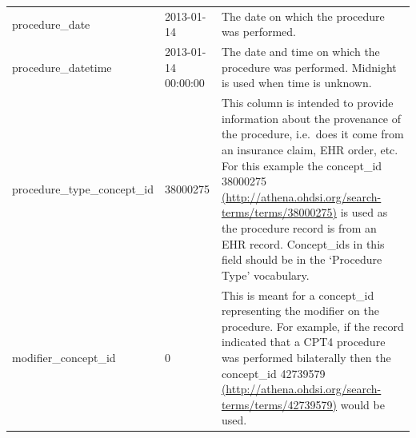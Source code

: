\documentclass[]{book}
\begin{document}
\begin{longtable}[]{@{}lll@{}}
\begin{minipage}[t]{0.30\columnwidth}
procedure\_date\strut
\end{minipage} & \begin{minipage}[t]{0.14\columnwidth}\raggedright
2013-01-14\strut
\end{minipage} & \begin{minipage}[t]{0.48\columnwidth}\raggedright
The date on which the procedure was performed.\strut
\end{minipage}\tabularnewline
\begin{minipage}[t]{0.30\columnwidth}\raggedright
procedure\_datetime\strut
\end{minipage} & \begin{minipage}[t]{0.14\columnwidth}\raggedright
2013-01-14 00:00:00\strut
\end{minipage} & \begin{minipage}[t]{0.48\columnwidth}\raggedright
The date and time on which the procedure was performed. Midnight is used when time is unknown.\strut
\end{minipage}\tabularnewline
\begin{minipage}[t]{0.30\columnwidth}\raggedright
procedure\_type\_concept\_id\strut
\end{minipage} & \begin{minipage}[t]{0.14\columnwidth}\raggedright
38000275\strut
\end{minipage} & \begin{minipage}[t]{0.48\columnwidth}\raggedright
This column is intended to provide information about the provenance of the procedure, i.e.~does it come from an insurance claim, EHR order, etc. For this example the concept\_id 38000275 \href{http://athena.ohdsi.org/search-terms/terms/38000275}{(http://athena.ohdsi.org/search-terms/terms/38000275)} is used as the procedure record is from an EHR record. Concept\_ids in this field should be in the `Procedure Type' vocabulary.\strut
\end{minipage}\tabularnewline
\begin{minipage}[t]{0.30\columnwidth}\raggedright
modifier\_concept\_id\strut
\end{minipage} & \begin{minipage}[t]{0.14\columnwidth}\raggedright
0\strut
\end{minipage} & \begin{minipage}[t]{0.48\columnwidth}\raggedright
This is meant for a concept\_id representing the modifier on the procedure. For example, if the record indicated that a CPT4 procedure was performed bilaterally then the concept\_id 42739579 \href{http://athena.ohdsi.org/search-terms/terms/42739579}{(http://athena.ohdsi.org/search-terms/terms/42739579)} would be used.\strut

\end{minipage}
\end{longtable}
\end{document}
